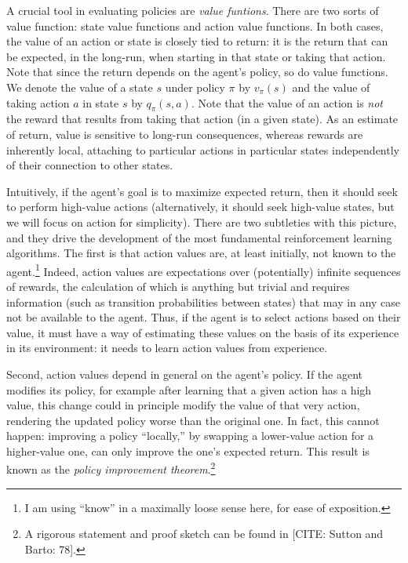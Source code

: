 A crucial tool in evaluating policies are \emph{value funtions}.
There are two sorts of value function: state value functions and action value functions.
In both cases, the value of an action or state is closely tied to return: it is the return that can be expected, in the long-run, when starting in that state or taking that action.
Note that since the return depends on the agent's policy, so do value functions.
We denote the value of a state $s$ under policy $\pi$ by $v_\pi(s)$ and the value of taking action $a$ in state $s$ by $q_\pi(s, a)$.
Note that the value of an action is \emph{not} the reward that results from taking that action (in a given state).
As an estimate of return, value is sensitive to long-run consequences, whereas rewards are inherently local, attaching to particular actions in particular states independently of their connection to other states.

Intuitively, if the agent's goal is to maximize expected return, then it should seek to perform high-value actions (alternatively, it should seek high-value states, but we will focus on action for simplicity).
There are two subtleties with this picture, and they drive the development of the most fundamental reinforcement learning algorithms.
The first is that action values are, at least initially, not known to the agent.\footnote{I am using ``know'' in a maximally loose sense here, for ease of exposition.}
Indeed, action values are expectations over (potentially) infinite sequences of rewards, the calculation of which is anything but trivial and requires information (such as transition probabilities between states) that may in any case not be available to the agent.
Thus, if the agent is to select actions based on their value, it must have a way of estimating these values on the basis of its experience in its environment: it needs to learn action values from experience.

Second, action values depend in general on the agent's policy.
If the agent modifies its policy, for example after learning that a given action has a high value, this change could in principle modify the value of that very action, rendering the updated policy worse than the original one.
In fact, this cannot happen: improving a policy ``locally,'' by swapping a lower-value action for a higher-value one, can only improve the one's expected return.
This result is known as the \emph{policy improvement theorem}.\footnote{A rigorous statement and proof sketch can be found in [CITE: Sutton and Barto: 78].}

